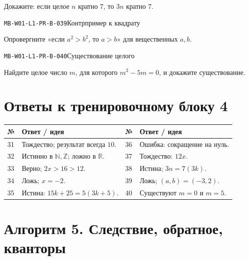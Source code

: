\documentclass[11pt,a4paper,openany]{book}
\newcommand{\muid}[1]{\texttt{\footnotesize #1}}
\renewcommand{\arraystretch}{1.38}
\begin{document}
Докажите: если целое $n$ кратно $7$, то $3n$ кратно $7$.\par\medskip

\noindent\hypertarget{MB-W01-L1-PR-B-039}{}\muid{MB-W01-L1-PR-B-039}\quad Контрпример к квадрату\par

Опровергните «если $a^2>b^2$, то $a>b$» для вещественных $a,b$.\par\medskip

\noindent\hypertarget{MB-W01-L1-PR-B-040}{}\muid{MB-W01-L1-PR-B-040}\quad Существование целого\par

Найдите целое число $m$, для которого $m^2-5m=0$, и докажите существование.\par\medskip

\clearpage\section*{Ответы к тренировочному блоку 4}


\begingroup\footnotesize\renewcommand{\arraystretch}{1.45}

\begin{tabularx}{\textwidth}{@{}p{10mm}X p{10mm}X@{}}\toprule № & Ответ / идея & № & Ответ / идея\\\midrule

31 & Тождество; результат всегда $10$. & 36 & Ошибка: сокращение на нуль.\\

32 & Истинно в $\mathbb N,\mathbb Z$; ложно в $\mathbb R$. & 37 & Тождество: $12x$.\\

33 & Верно; $2x>16>12$. & 38 & Истина; $3n=7(3k)$.\\

34 & Ложь; $x=-2$. & 39 & Ложь; $(a,b)=(-3,2)$.\\

35 & Истина: $15k+25=5(3k+5)$. & 40 & Существуют $m=0$ и $m=5$.\\

\bottomrule\end{tabularx}\endgroup

\clearpage{}

\section*{Алгоритм 5. Следствие, обратное, кванторы}
\end{document}
